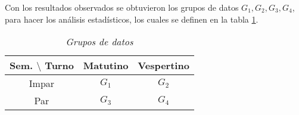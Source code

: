 Con los resultados observados se obtuvieron los grupos de datos $G_{1}, G_{2}, G_{3}, G_{4}$, para hacer los análisis estadísticos, los cuales se definen en la tabla \ref{GposDatos}.

\begin{table}[h]
\centering
\begin{tabular}{|c|c|c|}
\hline 
Sem. $\setminus$ Turno & Matutino & Vespertino \\ 
\hline 
Impar & $G_{1}$ & $G_{2}$ \\ 
\hline 
Par & $G_{3}$ & $G_{4}$ \\ 
\hline 
\end{tabular} 
\caption{\textit{Grupos de datos}}\label{GposDatos}
\end{table}
